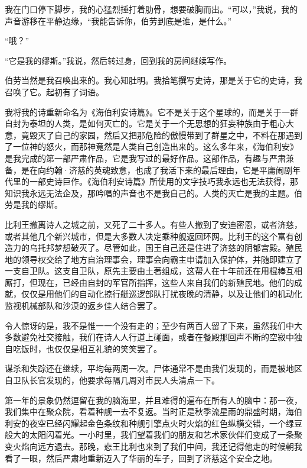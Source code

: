 \documentclass[AutoFakeBold=true]{book}
\begin{document}
我在门口停下脚步，我的心猛烈捶打着肋骨，想要破胸而出。``可以，''我说，我的声音游移在平静边缘，``我能告诉你，伯劳到底是谁，是什么。''

``哦？''

``它是我的缪斯。''我说，然后转过身，回到我的房间继续写作。

伯劳当然是我召唤出来的。我心知肚明。我拾笔撰写史诗，那是关于它的史诗，我召唤了它。起初有了词语。

我将我的诗重新命名为《海伯利安诗篇》。它不是关于这个星球的，而是关于一群自封为泰坦的人类，是如何灭亡的。它是关于一个无思想的狂妄种族由于粗心大意，竟毁灭了自己的家园，然后又把那危险的傲慢带到了群星之中，不料在那遇到了一位神的怒火，而那神竟然是人类自己创造出来的。这么多年来，《海伯利安》是我完成的第一部严肃作品，它是我写过的最好作品。这部作品，有趣与严肃兼备，是在向约翰·济慈的英魂致意，也成了我活下来的最后理由，它是平庸闹剧年代里的一部史诗巨作。《海伯利安诗篇》所使用的文字技巧我永远也无法获得，那知识我永远无法企及，那吟唱的声音也不是我自己的。人类的灭亡是我的主题。伯劳是我的缪斯。

比利王撤离诗人之城之前，又死了二十多人。有些人撤到了安迪密恩，或者济慈，或者其他几个新兴城市，但是大多数人决定乘种舰返回环网。比利王的这个富有创造力的乌托邦梦想破灭了。尽管如此，国王自己还是住进了济慈的阴郁宫殿。殖民地的领导权交给了地方自治理事会，理事会向霸主申请加入保护体，并随即建立了一支自卫队。这支自卫队，原先主要由土著组成，这帮人在十年前还在用棍棒互相厮打，但现在，已经由自封的军官所指挥，这些人来自我们的新殖民地。他们的成就，仅仅是用他们的自动化掠行艇巡逻部队打扰夜晚的清静，以及让他们的机动化监视机械部队和沙漠的返乡佳人结合罢了。

令人惊讶的是，我不是惟一一个没有走的；至少有两百人留了下来，虽然我们中大多数避免社交接触，我们在诗人人行道上碰面，或者在餐殿那回声不断的空寂中独自吃饭时，也仅仅是相互礼貌的笑笑罢了。

谋杀和失踪还在继续，平均每两周一次。尸体通常不是由我们发现的，而是被地区自卫队长官发现的，他要求每隔几周对市民人头清点一下。

第一年的景象仍然逗留在我的脑海里，并且难得的遍布在所有人的脑中：那一夜，我们集中在聚众院，看着种舰一去不复返。当时正是秋季流星雨的鼎盛时期，海伯利安的夜空已经闪耀起金色条纹和种舰引擎点火时火焰的红色纵横交错，一个绿豆般大的太阳闪着光。一小时里，我们望着我们的朋友和艺术家伙伴们变成了一条聚变火焰向远方退去。那晚，悲王比利也来到了我们中间，我还记得他走的时候朝我看了一眼，然后严肃地重新迈入了华丽的车子，回到了济慈这个安全之地。

\vspace*{1em}
\end{document}
